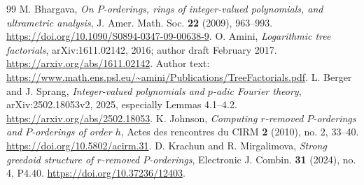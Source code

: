 \documentclass[11pt]{article}
\theoremstyle{definition}
\begin{document}
\begin{thebibliography}{99}
 M. Bhargava, \emph{On $P$-orderings, rings of integer-valued polynomials, and ultrametric analysis}, J. Amer. Math. Soc. \textbf{22} (2009), 963--993. \url{https://doi.org/10.1090/S0894-0347-09-00638-9}.
 O. Amini, \emph{Logarithmic tree factorials}, arXiv:1611.02142, 2016; author draft February 2017. \url{https://arxiv.org/abs/1611.02142}. Author text: \url{https://www.math.ens.psl.eu/~amini/Publications/TreeFactorials.pdf}.
 L. Berger and J. Sprang, \emph{Integer-valued polynomials and $p$-adic Fourier theory}, arXiv:2502.18053v2, 2025, especially Lemmas 4.1--4.2. \url{https://arxiv.org/abs/2502.18053}.
 K. Johnson, \emph{Computing $r$-removed $P$-orderings and $P$-orderings of order $h$}, Actes des rencontres du CIRM \textbf{2} (2010), no. 2, 33--40. \url{https://doi.org/10.5802/acirm.31}.
 D. Krachun and R. Mirgalimova, \emph{Strong greedoid structure of $r$-removed $P$-orderings}, Electronic J. Combin. \textbf{31} (2024), no. 4, P4.40. \url{https://doi.org/10.37236/12403}.
\end{thebibliography}
\end{document}
